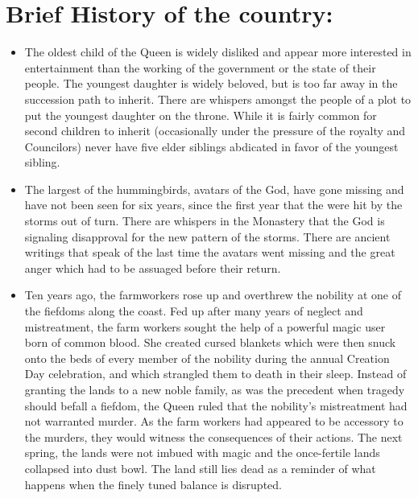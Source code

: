 \documentclass[blue]{GL2020}
\begin{document}

\section*{Brief History of the country:}

\begin{itemize}
	\item The oldest child of the Queen is widely disliked and appear more interested in entertainment than the working of the government or the state of their people.  The youngest daughter is widely beloved, but is too far away in the succession path to inherit.  There are whispers amongst the people of a plot to put the youngest daughter on the throne.  While it is fairly common for second children to inherit (occasionally under the pressure of the royalty and Councilors) never have five elder siblings abdicated in favor of the youngest sibling.
	\item The largest of the hummingbirds, avatars of the God, have gone missing and have not been seen for six years, since the first year that the \pShip{} were hit by the storms out of turn.  There are whispers in the Monastery that the God is signaling disapproval for the new pattern of the storms.  There are ancient writings that speak of the last time the avatars went missing and the great anger which had to be assuaged before their return. %
	\item Ten years ago, the farmworkers rose up and overthrew the nobility at one of the fiefdoms along the coast.  Fed up after many years of neglect and mistreatment, the farm workers sought the help of a powerful magic user born of common blood.  She created cursed blankets which were then snuck onto the beds of every member of the nobility during the annual Creation Day celebration, and which strangled them to death in their sleep.  Instead of granting the lands to a new noble family, as was the precedent when tragedy should befall a fiefdom, the Queen ruled that the nobility's mistreatment had not warranted murder.  As the farm workers had appeared to be accessory to the murders, they would witness the consequences of their actions.  The next spring, the lands were not imbued with magic and the once-fertile lands collapsed into dust bowl.  The land still lies dead as a reminder of what happens when the finely tuned balance is disrupted.
\end{itemize}
\end{document}
